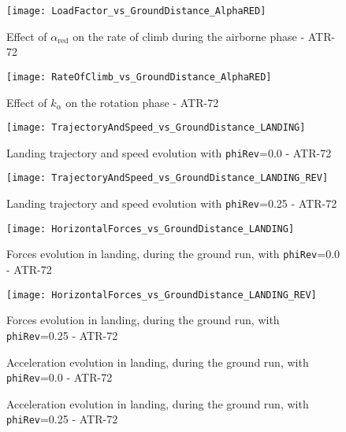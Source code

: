 %
\begin{figure}[H]
\centering
\texttt{[image: LoadFactor\_vs\_GroundDistance\_AlphaRED]}
\caption{Effect of $\alpha_{\text{red}}$ on the rate of climb during the airborne phase - ATR-72}
\label{fig:LoadFactorAlphaRED}
\end{figure}
%
\begin{figure}[H]
\centering
\texttt{[image: RateOfClimb\_vs\_GroundDistance\_AlphaRED]}
\caption{Effect of $k_{\alpha}$ on the rotation phase - ATR-72}
\label{fig:RateOfClimbAlphaRED}
\end{figure}
%
%
\begin{figure}[!t]
\centering
\texttt{[image: TrajectoryAndSpeed\_vs\_GroundDistance\_LANDING]}
\caption{Landing trajectory and speed evolution with \lstinline[language=Java]!phiRev!=0.0 - ATR-72}
\label{fig:Landing1}
\end{figure}
%
\begin{figure}[!b]
\centering
\texttt{[image: TrajectoryAndSpeed\_vs\_GroundDistance\_LANDING\_REV]}
\caption{Landing trajectory and speed evolution with \lstinline[language=Java]!phiRev!=0.25 - ATR-72}
\end{figure}
%
\begin{figure}[!t]
\centering
\texttt{[image: HorizontalForces\_vs\_GroundDistance\_LANDING]}
\caption{Forces evolution in landing, during the ground run, with \lstinline[language=Java]!phiRev!=0.0 - ATR-72}
\end{figure}
%
\begin{figure}[!b]
\centering
\texttt{[image: HorizontalForces\_vs\_GroundDistance\_LANDING\_REV]}
\caption{Forces evolution in landing, during the ground run, with \lstinline[language=Java]!phiRev!=0.25 - ATR-72}
\end{figure}
%
\begin{figure}[!t]
\centering

\caption{Acceleration evolution in landing, during the ground run, with \lstinline[language=Java]!phiRev!=0.0 - ATR-72}
\end{figure}
%
\begin{figure}[!b]
\centering

\caption{Acceleration evolution in landing, during the ground run, with \lstinline[language=Java]!phiRev!=0.25 - ATR-72}
\end{figure}
